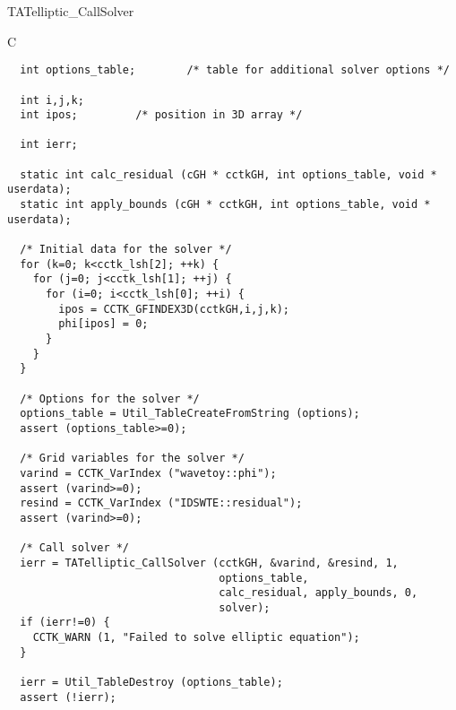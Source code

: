 \begin{FunctionDescription}{TATelliptic\_CallSolver}
\begin{ExampleSection}
\begin{Example}{C}
\begin{verbatim}
  int options_table;		/* table for additional solver options */
  
  int i,j,k;
  int ipos;			/* position in 3D array */
  
  int ierr;
  
  static int calc_residual (cGH * cctkGH, int options_table, void * userdata);
  static int apply_bounds (cGH * cctkGH, int options_table, void * userdata);
  
  /* Initial data for the solver */
  for (k=0; k<cctk_lsh[2]; ++k) {
    for (j=0; j<cctk_lsh[1]; ++j) {
      for (i=0; i<cctk_lsh[0]; ++i) {
        ipos = CCTK_GFINDEX3D(cctkGH,i,j,k);
        phi[ipos] = 0;
      }
    }
  }
  
  /* Options for the solver */
  options_table = Util_TableCreateFromString (options);
  assert (options_table>=0);
  
  /* Grid variables for the solver */
  varind = CCTK_VarIndex ("wavetoy::phi");
  assert (varind>=0);
  resind = CCTK_VarIndex ("IDSWTE::residual");
  assert (varind>=0);
  
  /* Call solver */
  ierr = TATelliptic_CallSolver (cctkGH, &varind, &resind, 1,
                                 options_table,
                                 calc_residual, apply_bounds, 0,
                                 solver);
  if (ierr!=0) {
    CCTK_WARN (1, "Failed to solve elliptic equation");
  }
  
  ierr = Util_TableDestroy (options_table);
  assert (!ierr);
\end{verbatim}
\end{Example}
\end{ExampleSection}

\end{FunctionDescription}



